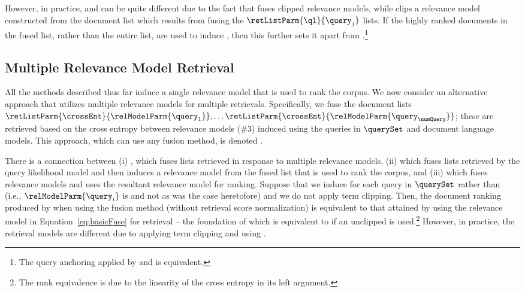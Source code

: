 However, in practice, \method{\ariRM} and \method{\fuseDocRM} can be quite different due
to the fact that \method{\ariRM} fuses clipped relevance models, while
\method{\fuseDocRM} clips a relevance model constructed from the document list
which results from fusing the $\retListParm{\ql}{\query_j}$ lists.
If the highly ranked documents in the fused list, rather than the
entire list, are used to induce \method{\fuseDocRM}, then this further sets it
apart from \method{\ariRM}.\footnote{The query
anchoring applied by \method{\ariRM} and  is equivalent.}



\subsection{Multiple Relevance Model Retrieval} 
All the methods described thus far induce a single relevance model
that is used to rank the corpus.
We now consider an alternative approach that utilizes multiple
relevance models for multiple retrievals.
Specifically, we fuse the document lists
$\retListParm{\crossEnt}{\relModelParm{\query_1}},\ldots
\retListParm{\crossEnt}{\relModelParm{\query_{\numQuery}}}$; these are
retrieved based on the cross entropy between relevance models (\#3)
induced using the queries in $\querySet$ and document language
models.
This approach, which can use any fusion method, is denoted
\firstmention{\multRM}.

There is a connection between (i) \method{\multRM}, which fuses lists
retrieved in response to multiple relevance models,
(ii) \method{\fuseDocRM} which fuses lists retrieved by the query
likelihood model and then induces a relevance model from the fused
list that is used to rank the corpus, and (iii) \method{\ariRM} which
fuses relevance models and uses the resultant relevance model for
ranking.  Suppose that we induce \rmOne for each query in
$\querySet$ rather than \rmThree~ (i.e., $\relModelParm{\query_i}$
is \rmOne and not \rmThree as was the case heretofore) and we do
not apply term clipping.  Then, the document ranking produced
by \method{\multRM} when using the  fusion method
(without retrieval score normalization) is equivalent to that attained
by using the relevance model in Equation~\ref{eq:basicFuse} for
retrieval -- the foundation of
\method{\fuseDocRM} which is equivalent to \method{\ariRM} if an unclipped \rmOne is
used.\footnote{The rank equivalence is due to the linearity of the
cross entropy in its left argument.}
However, in practice, the retrieval models are different due to
applying term clipping and using \rmThree.

